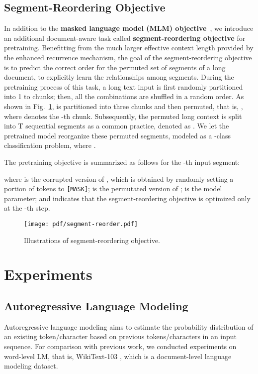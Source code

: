 \documentclass[11pt,a4paper]{article}
\begin{document}
\subsection{Segment-Reordering Objective}\label{sec:sent-reorder}
In addition to the \textbf{masked language model (MLM) objective}~\citep{devlin2018bert}, we introduce an additional document-aware task called \textbf{segment-reordering objective} for pretraining. Benefitting from the much larger effective context length provided by the enhanced recurrence mechanism, the goal of the segment-reordering objective is to predict the correct order for the permuted set of segments of a long document, to explicitly learn the relationships among segments. During the pretraining process of this task, a long text input  is first randomly partitioned into 1 to  chunks; then, all the combinations are shuffled in a random order. As shown in Fig.~\ref{fig:segment-reorder},  is partitioned into three chunks and then permuted, that is, , where  denotes the -th chunk. Subsequently, the permuted long context  is split into T sequential segments as a common practice, denoted as . We let the pretrained model reorganize these permuted segments, modeled as a -class classification problem, where . 

The pretraining objective is summarized as follows for the -th input segment: 

where  is the corrupted version of , which is obtained by randomly setting a portion of tokens to \texttt{[MASK]};  is the permutated version of ;  is the model parameter; and  indicates that the segment-reordering objective is optimized only at the -th step.


\begin{figure}[t]
\centering
\texttt{[image: pdf/segment-reorder.pdf]}
\caption{Illustrations of segment-reordering objective.}
\label{fig:segment-reorder}
\vspace{-0.5cm}
\end{figure}

\section{Experiments}
\subsection{Autoregressive Language Modeling}
Autoregressive language modeling aims to estimate the probability distribution of an existing token/character based on previous tokens/characters in an input sequence. For comparison with previous work, we conducted experiments on word-level LM, that is, WikiText-103 \citep{wikitext}, which is a document-level language modeling dataset.
\end{document}
